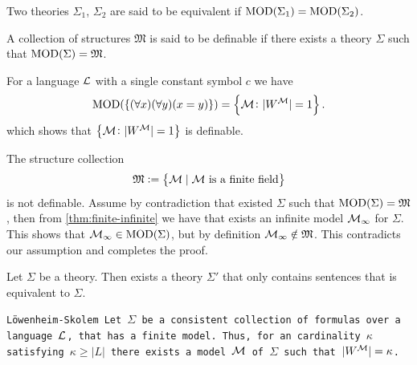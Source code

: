 \documentclass[11pt,a4paper]{article}
\begin{document}
\begin{definition}
  Two theories $\Sigma_1$, $\Sigma_2$ are said to be equivalent if
  $\operatorname{MOD}(\Sigma_1) = \operatorname{MOD}(\Sigma_2)$.
\end{definition}

\begin{definition}
  A collection of structures $\mathfrak M$ is said to be definable
  if there exists a theory $\Sigma$ such that $\operatorname{MOD}(\Sigma) = \mathfrak M$.
\end{definition}

\begin{example}
  For a language $\mathcal{L}$ with a single constant symbol $c$ we have
  \[
    \operatorname{MOD}(\{(\forall x)(\forall y)(x = y)\}) =
    \left\{\mathcal{M} \colon |W^{\mathcal{M}}| = 1\right\}.
  \]
  which shows that $\left\{\mathcal{M} \colon |W^{\mathcal{M}}| = 1\right\}$ is definable.
\end{example}

\begin{example}
  The structure collection
  \[
    \mathfrak M := \left\{\mathcal{M} \mid \text{$\mathcal{M}$ is a finite field}\right\}
  \]
  is not definable.
  Assume by contradiction that existed $\Sigma$ such that 
  $\operatorname{MOD}(\Sigma) = \mathfrak M$, then from 
  \autoref{thm:finite-infinite}
  we have that exists an infinite model $\mathcal{M}_\infty$ for $\Sigma$.
  This shows that $\mathcal{M}_\infty \in \operatorname{MOD}(\Sigma)$, but by definition
  $\mathcal{M}_\infty \notin \mathfrak M$.
  This contradicts our assumption and completes the proof.
\end{example}


\begin{proposition}
  Let $\Sigma$ be a theory. Then exists a theory $\Sigma'$ that only contains
  sentences that is equivalent to $\Sigma$.
\end{proposition}

\begin{theorem}\tt{Löwenheim-Skolem}
  Let $\Sigma$ be a consistent collection of formulas over a language $\mathcal{L}$,
  that has a finite model. Thus, for an cardinality $\kappa$ satisfying
  $\kappa \geq |L|$ there exists a model $\mathcal{M}$ of $\Sigma$ such that
  $|W^{\mathcal{M}}| = \kappa$.
\end{theorem}
\end{document}
